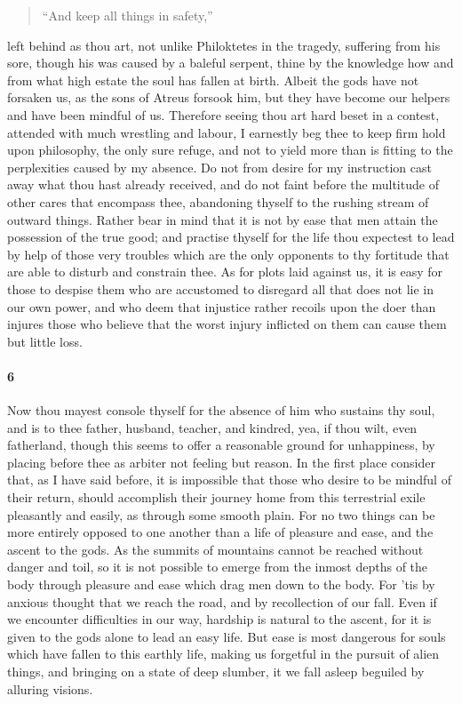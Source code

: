 \documentclass[12pt]{article}
\begin{document}
\begin{quote}
``And keep all things in safety,''
\end{quote}

\noindent left behind as thou art, not unlike Philoktetes in the tragedy,
suffering from his sore, though his was caused by a baleful serpent, thine by
the knowledge how and from what high estate the soul has fallen at birth.
Albeit the gods have not forsaken us, as the sons of Atreus forsook him, but
they have become our helpers and have been mindful of us. Therefore seeing thou
art hard beset in a contest, attended with much wrestling and labour, I
earnestly beg thee to keep firm hold upon philosophy, the only sure refuge, and
not to yield more than is fitting to the perplexities caused by my absence. Do
not from desire for my instruction cast away what thou hast already received,
and do not faint before the multitude of other cares that encompass thee,
abandoning thyself to the rushing stream of outward things. Rather bear in mind
that it is not by ease that men attain the possession of the true good; and
practise thyself for the life thou expectest to lead by help of those very
troubles which are the only opponents to thy fortitude that are able to disturb
and constrain thee. As for plots laid against us, it is easy for those to
despise them who are accustomed to disregard all that does not lie in our own
power, and who deem that injustice rather recoils upon the doer than injures
those who believe that the worst injury inflicted on them can cause them but
little loss.

\paragraph{6} Now thou mayest console thyself for the absence of him who
sustains thy soul, and is to thee father, husband, teacher, and kindred, yea,
if thou wilt, even fatherland, though this seems to offer a reasonable ground
for unhappiness, by placing before thee as arbiter not feeling but reason. In
the first place consider that, as I have said before, it is impossible that
those who desire to be mindful of their return, should accomplish their journey
home from this terrestrial exile pleasantly and easily, as through some smooth
plain. For no two things can be more entirely opposed to one another than a
life of pleasure and ease, and the ascent to the gods. As the summits of
mountains cannot be reached without danger and toil, so it is not possible to
emerge from the inmost depths of the body through pleasure and ease which drag
men down to the body. For 'tis by anxious thought that we reach the road, and
by recollection of our fall. Even if we encounter difficulties in our way,
hardship is natural to the ascent, for it is given to the gods alone to lead an
easy life. But ease is most dangerous for souls which have fallen to this
earthly life, making us forgetful in the pursuit of alien things, and bringing
on a state of deep slumber, it we fall asleep beguiled by alluring visions.
\end{document}
